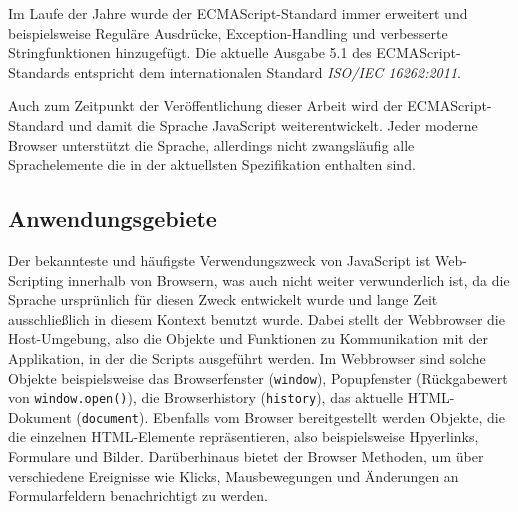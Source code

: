 Im Laufe der Jahre wurde der ECMAScript-Standard immer erweitert und beispielsweise Reguläre
Ausdrücke, Exception-Handling und verbesserte Stringfunktionen hinzugefügt. Die aktuelle Ausgabe 5.1
des ECMAScript-Standards entspricht dem internationalen Standard \emph{ISO/IEC 16262:2011}.
\citep{ecmascript}

Auch zum Zeitpunkt der Veröffentlichung dieser Arbeit wird der ECMAScript-Standard und damit die
Sprache JavaScript weiterentwickelt. Jeder moderne Browser unterstützt die Sprache, allerdings
nicht zwangsläufig alle Sprachelemente die in der aktuellsten Spezifikation enthalten sind.


\subsection{Anwendungsgebiete}

Der bekannteste und häufigste Verwendungszweck von JavaScript ist Web-Scripting innerhalb von
Browsern, was auch nicht weiter verwunderlich ist, da die Sprache ursprünlich für diesen Zweck
entwickelt wurde und lange Zeit ausschließlich in diesem Kontext benutzt wurde. Dabei stellt der
Webbrowser die Host-Umgebung, also die Objekte und Funktionen zu Kommunikation mit der Applikation,
in der die Scripts ausgeführt werden. Im Webbrowser sind solche Objekte beispielsweise das
Browserfenster (\lstinline{window}), Popupfenster (Rückgabewert von \lstinline{window.open()}),
die Browserhistory (\lstinline{history}), das aktuelle HTML-Dokument (\lstinline{document}).
Ebenfalls vom Browser bereitgestellt werden Objekte, die die einzelnen HTML-Elemente repräsentieren,
also beispielsweise Hpyerlinks, Formulare und Bilder. Darüberhinaus bietet der Browser Methoden, um
über verschiedene Ereignisse wie Klicks, Mausbewegungen und Änderungen an Formularfeldern
benachrichtigt zu werden.
\citep[Kap. 4.1]{ecmascript}

